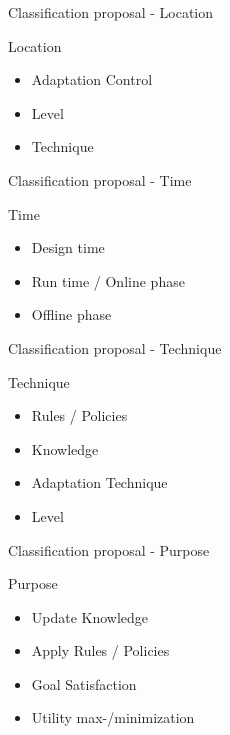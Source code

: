 \documentclass[en,16:9]{sdqbeamer}
\begin{document}
\begin{frame}{Classification proposal - Location}
	\begin{greenblock}{Location}
		\begin{itemize}
			\item Adaptation Control
			\item Level
			\item Technique
		\end{itemize}
	\end{greenblock}
\end{frame}

\begin{frame}{Classification proposal - Time}
	\begin{greenblock}{Time}
		\begin{itemize}
			\item Design time
			\item Run time / Online phase
			\item Offline phase
		\end{itemize}
	\end{greenblock}
\end{frame}

\begin{frame}{Classification proposal - Technique}
	\begin{greenblock}{Technique}
		\begin{itemize}
			\item Rules / Policies
			\item Knowledge
			\item Adaptation Technique
			\item Level
		\end{itemize}
	\end{greenblock}
\end{frame}

\begin{frame}{Classification proposal - Purpose}
	\begin{greenblock}{Purpose}
		\begin{itemize}
			\item Update Knowledge
			\item Apply Rules / Policies
			\item Goal Satisfaction
			\item Utility max-/minimization
		\end{itemize}
	\end{greenblock}
\end{frame}
\end{document}
